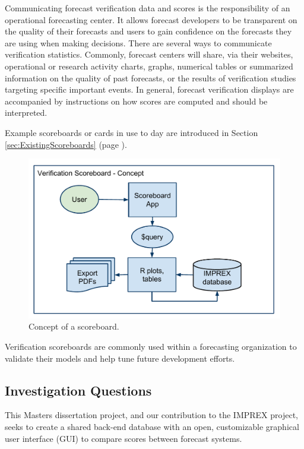 \documentclass[logos,parttoc,morelanguage=french,morelanguage=german]{orsay-memoire}
\begin{document}
Communicating forecast verification data and scores is the responsibility of an operational forecasting center. It allows forecast developers to be transparent on the quality of their forecasts and users to gain confidence on the forecasts they are using when making decisions. There are several ways to communicate verification statistics. Commonly, forecast centers will share, via their websites, operational or research activity charts, graphs, numerical tables or summarized information on the quality of past forecasts, or the results of verification studies targeting specific important events. In general, forecast verification displays are accompanied by instructions on how scores are computed and should be interpreted.

Example scoreboards or cards in use to day are introduced in Section \ref{sec:ExistingScoreboards} (page \pageref{sec:ExistingScoreboards}).

\begin{figure}[ht]
\centering
\includegraphics[width=0.85\linewidth]{images/IMPREX_Schema.pdf}
  \caption{Concept of a scoreboard.}
  \label{fig:scoreboard concept}
\end{figure}

Verification scoreboards are commonly used within a forecasting organization to validate their models and help tune future development efforts. 

\subsection{Investigation Questions}

This Masters dissertation project, and our contribution to the IMPREX project, seeks to create a shared back-end database with an open, customizable graphical user interface (GUI) to compare scores between forecast systems.
\end{document}
